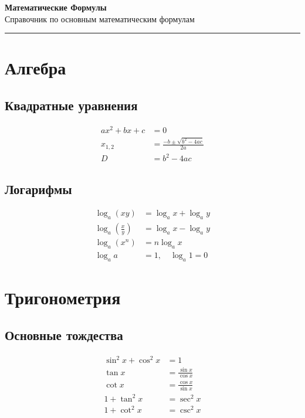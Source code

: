 \documentclass[10pt,landscape,a4paper]{article}
\begin{document}
\begin{center}
    {\Huge\bfseries Математические Формулы}\\[0.5cm]
    {\large Справочник по основным математическим формулам}\\[0.3cm]
    \rule{\textwidth}{1pt}
\end{center}

\begin{multicols}{2}

\section{Алгебра}

\subsection{Квадратные уравнения}
\begin{align}
    ax^2 + bx + c &= 0 \\
    x_{1,2} &= \frac{-b \pm \sqrt{b^2 - 4ac}}{2a} \\
    D &= b^2 - 4ac
\end{align}

\subsection{Логарифмы}
\begin{align}
    \log_a(xy) &= \log_a x + \log_a y \\
    \log_a\left(\frac{x}{y}\right) &= \log_a x - \log_a y \\
    \log_a(x^n) &= n \log_a x \\
    \log_a a &= 1, \quad \log_a 1 = 0
\end{align}

\section{Тригонометрия}

\subsection{Основные тождества}
\begin{align}
    \sin^2 x + \cos^2 x &= 1 \\
    \tan x &= \frac{\sin x}{\cos x} \\
    \cot x &= \frac{\cos x}{\sin x} \\
    1 + \tan^2 x &= \sec^2 x \\
    1 + \cot^2 x &= \csc^2 x
\end{align}


\end{multicols}
\end{document}
